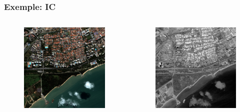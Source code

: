 \documentclass[compress]{beamer}
\begin{document}
\begin{frame}
\frametitle{Exemple: IC}
\begin{columns}
\begin{column}{0.5\textwidth}
\begin{figure}[]
  \includegraphics[width=1.0\textwidth]{radio2-extract-3b.jpg}
\end{figure}
\end{column}
\begin{column}{0.5\textwidth}
\begin{figure}[]
  \includegraphics[width=1.0\textwidth]{Radiometry-IC.jpg}
\end{figure}
\end{column}
\end{columns}
\end{frame}
\end{document}
